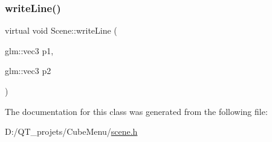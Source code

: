 \subsubsection{\texorpdfstring{write\+Line()}{writeLine()}}
{\footnotesize\ttfamily virtual void Scene\+::write\+Line (\begin{DoxyParamCaption}\item[{glm\+::vec3}]{p1,  }\item[{glm\+::vec3}]{p2 }\end{DoxyParamCaption})\hspace{0.3cm}{\ttfamily [pure virtual]}}



The documentation for this class was generated from the following file\+:\begin{DoxyCompactItemize}
\item 
D\+:/\+Q\+T\+\_\+projets/\+Cube\+Menu/\hyperlink{scene_8h}{scene.\+h}\end{DoxyCompactItemize}
